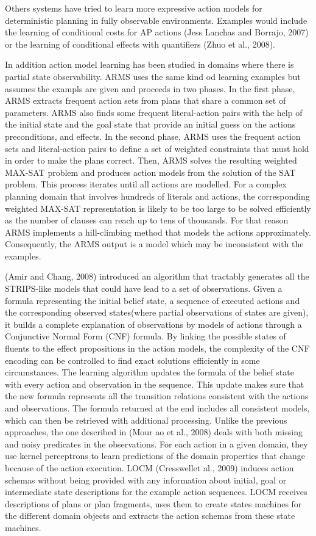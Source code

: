 \documentclass[letterpaper]{article} %
\begin{document}
Others systems have tried to learn more expressive action models for deterministic planning in fully observable environments. Examples would include the learning of conditional costs for AP actions (Jess Lanchas and Borrajo, 2007) or the learning of conditional effects with quantifiers (Zhuo et al., 2008).

In addition action model learning has been studied in domains where there is partial state observability. ARMS uses the same kind od learning examples but assumes the exampls are given and proceeds in two phases. In the first phase, ARMS extracts frequent action sets from plans that share a common set of parameters. ARMS also finds some frequent literal-action pairs with the help of the initial state and the goal state that provide an initial guess on the actions preconditions, and effects. In the second phase, ARMS uses the frequent action sets and literal-action pairs to define a set of weighted constraints that must hold in order to make the plans correct. Then, ARMS solves the resulting weighted MAX-SAT problem and produces action models from the solution of the SAT problem. This process iterates until all actions are modelled. For a complex planning domain that involves hundreds of literals and actions, the corresponding weighted MAX-SAT representation is likely to be too large to be solved efficiently as the number of clauses can reach up to tens of thousands. For that reason ARMS implements a hill-climbing method that models the actions approximately. Consequently, the ARMS output is a model which may be inconsistent with the examples.

(Amir and Chang, 2008) introduced an algorithm that tractably generates all the STRIPS-like models that  could  have  lead  to  a  set  of  observations.  Given  a  formula  representing  the  initial  belief  state,  a sequence of executed actions and the corresponding observed states(where partial observations of states are given), it builds a complete explanation of observations by models of actions through a Conjunctive Normal Form (CNF) formula. By linking the possible states of fluents to the effect propositions in the action models, the complexity of the CNF encoding can be controlled to find  exact  solutions  efficiently  in  some  circumstances.  The  learning  algorithm  updates  the  formula  of the belief state with every action and observation in the sequence. This update makes sure that the new formula represents all the transition relations consistent with the actions and observations. The formula returned at the end includes all consistent models, which can then be retrieved with additional processing. Unlike the previous approaches, the one described in (Mour ao et al., 2008) deals with both missing and noisy predicates in the observations. For each action in a given domain, they use kernel perceptrons to learn predictions of the domain properties that change because of the action execution. LOCM (Cresswellet al., 2009) induces action schemas without being provided with any information about initial, goal or intermediate state descriptions for the example action sequences. LOCM receives descriptions of plans or plan fragments, uses them to create states machines for the different domain objects and extracts the action schemas from these state machines.
\end{document}
